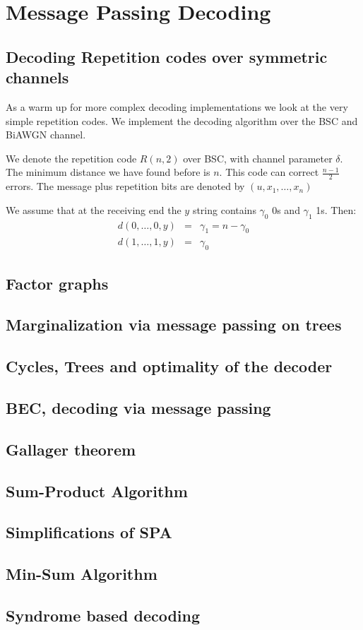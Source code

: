 \chapter{Message Passing Decoding}

\section{Decoding Repetition codes over symmetric channels}
As a warm up for more complex decoding implementations we look at the very simple repetition codes. We implement the decoding algorithm over the BSC and BiAWGN channel. 

We denote the repetition code $R(n, 2)$ over BSC, with channel parameter $\delta$. The minimum distance we have found before is $n$. This code can correct $\frac{n-1}{2}$ errors. The message plus repetition bits are denoted by $(u, x_1, \dots, x_n)$ 

We assume that at the receiving end the $y$ string contains $\gamma_0$ 0s and $\gamma_1$ 1s. Then:
\begin{eqnarray}
	d(0, \dots, 0, y) &=& \gamma_1  = n-\gamma_0 \\
	d(1, \dots, 1, y) &=& \gamma_0
\end{eqnarray}


\section{Factor graphs}

\section{Marginalization via message passing on trees}

\section{Cycles, Trees and optimality of the decoder}
\section{BEC, decoding via message passing}
\section{Gallager theorem}
\section{Sum-Product Algorithm}
\section{Simplifications of SPA}
\section{Min-Sum Algorithm}
\section{Syndrome based decoding}
